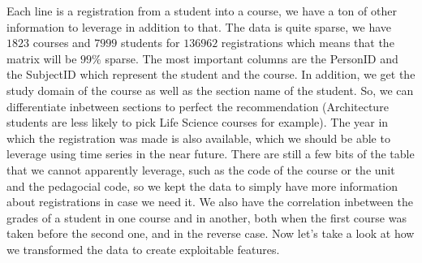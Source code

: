 \documentclass{article}
\begin{document}
\begin{flushleft}
\end{flushleft}
        Each line is a registration from a student into a course, we have a ton of other information to leverage in addition to that. The data is quite sparse, we have $1823$ courses and $7999$ students for $136962$ registrations which means that the matrix will be $99\%$ sparse. The most important columns are the PersonID and the SubjectID which represent the student and the course. In addition, we get the study domain of the course as well as the section name of the student. So, we can differentiate inbetween sections to perfect the recommendation (Architecture students are less likely to pick Life Science courses for example). The year in which the registration was made is also available, which we should be able to leverage using time series in the near future. There are still a few bits of the table that we cannot apparently leverage, such as the code of the course or the unit and the pedagocial code, so we kept the data to simply have more information about registrations in case we need it. We also have the correlation inbetween the grades of a student in one course and in another, both when the first course was taken before the second one, and in the reverse case. Now let's take a look at how we transformed the data to create exploitable features.
\end{document}
